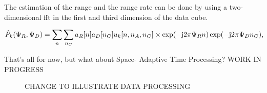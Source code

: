 The estimation of the range and the range rate can be done by using a two-dimensional fft in the first and third dimension of the data cube.

\begin{equation}
\hat{P}_k(\Psi_R,\Psi_D) = \sum_{n}\sum_{n_C} a_R[n] a_D[n_C] u_k[n,n_A,n_C]\times\exp(-\mj2\pi\Psi_Rn)\exp(-\mj2\pi\Psi_Dn_C) \rlap{,}
\end{equation}

That's all for now, but what about Space- Adaptive Time Processing? WORK IN PROGRESS

\begin{figure}[h]
	\centering
	
	\caption{CHANGE TO ILLUSTRATE DATA PROCESSING }
	\label{fig:datacube2}
\end{figure} 



